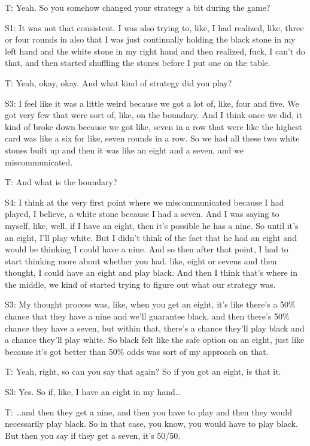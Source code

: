 T: Yeah. So you somehow changed your strategy a bit during the game?

S1: It was not that consistent. I was also trying to, like, I had realized, like, three or four rounds in also that I was just continually holding the black stone in my left hand and the white stone in my right hand and then realized, fuck, I can't do that, and then started shuffling the stones before I put one on the table.

T: Yeah, okay, okay. And what kind of strategy did you play? 

S3: I feel like it was a little weird because we got a lot of, like, four and five. We got very few that were sort of, like, on the boundary. And I think once we did, it kind of broke down because we got like, seven in a row that were like the highest card was like a six for like, seven rounds in a row. So we had all these two white stones built up and then it was like an eight and a seven, and we miscommunicated. 

T: And what is the boundary? 

S4: I think at the very first point where we miscommunicated because I had played, I believe, a white stone because I had a seven. And I was saying to myself, like, well, if I have an eight, then it's possible he has a nine. So until it's an eight, I'll play white. But I didn't think of the fact that he had an eight and would be thinking I could have a nine. And so then after that point, I had to start thinking more about whether you had. like, eight or sevens and then thought, I could have an eight and play black. And then I think that's where in the middle, we kind of started trying to figure out what our strategy was. 

S3: My thought process was, like, when you get an eight, it's like there's a 50\% chance that they have a nine and we'll guarantee black, and then there's 50\% chance they have a seven, but within that, there's a chance they'll play black and a chance they'll play white. So black felt like the safe option on an eight, just like because it's got better than 50\% odds was sort of my approach on that. 

T: Yeah, right, so can you say that again? So if you got an eight, is that it. 

S3: Yes. So if, like, I have an eight in my hand…

T: …and then they get a nine, and then you have to play and then they would necessarily play black. So in that case, you know, you would have to play black. But then you say if they get a seven, it's 50/50.

